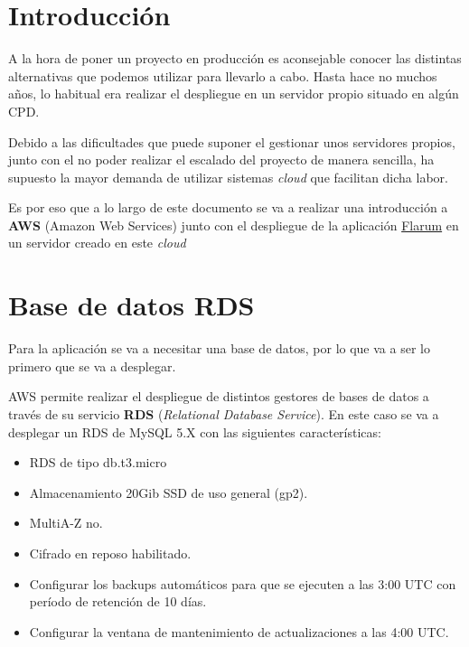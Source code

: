 \documentclass{\ClassPath/viu-tfm-template}
\begin{document}
    \graphicspath{{../VIU_TFM_LaTeX_template/}}

    \coverpage

    \tableofcontents

\chapter{Introducción}

A la hora de poner un proyecto en producción es aconsejable conocer las distintas alternativas que podemos utilizar para llevarlo a cabo. Hasta hace no muchos años, lo habitual era realizar el despliegue en un servidor propio situado en algún CPD.

Debido a las dificultades que puede suponer el gestionar unos servidores propios, junto con el no poder realizar el escalado del proyecto de manera sencilla, ha supuesto la mayor demanda de utilizar sistemas \textit{cloud} que facilitan dicha labor.

Es por eso que a lo largo de este documento se va a realizar una introducción a \textbf{AWS} (Amazon Web Services) junto con el despliegue de la aplicación \href{https://flarum.org/}{Flarum} en un servidor creado en este \textit{cloud}


\chapter{Base de datos RDS}
Para la aplicación se va a necesitar una base de datos, por lo que va a ser lo primero que se va a desplegar.

AWS permite realizar el despliegue de distintos gestores de bases de datos a través de su servicio \textbf{RDS} (\textit{Relational Database Service}). En este caso se va a desplegar un RDS de MySQL 5.X con las siguientes características:

\begin{itemize}
    \item RDS de tipo db.t3.micro
    \item Almacenamiento 20Gib SSD de uso general (gp2).
    \item MultiA-Z no.
    \item Cifrado en reposo habilitado.
    \item Configurar los backups automáticos para que se ejecuten a las 3:00 UTC con período de retención de 10
    días.
    \item Configurar la ventana de mantenimiento de actualizaciones a las 4:00 UTC.
\end{itemize}
\end{document}
